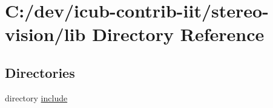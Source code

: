 \section{C\+:/dev/icub-\/contrib-\/iit/stereo-\/vision/lib Directory Reference}
\label{dir_97aefd0d527b934f1d99a682da8fe6a9}
\subsection*{Directories}
\begin{DoxyCompactItemize}
\item 
directory \hyperlink{dir_5a30104352ef4255dc24354b02eb2d20}{include}
\end{DoxyCompactItemize}
